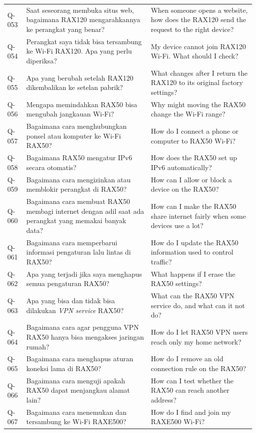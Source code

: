 \begin{longtable}{@{}>{\RaggedRight\arraybackslash}p{1.6cm}>{\RaggedRight\arraybackslash}p{5.8cm}>{\RaggedRight\arraybackslash}p{\dimexpr\textwidth-1.6cm-5.8cm-4\tabcolsep\relax}@{}}
Q-053 & Saat seseorang membuka situs web, bagaimana RAX120 mengarahkannya ke perangkat yang benar? & When someone opens a website, how does the RAX120 send the request to the right device? \\
Q-054 & Perangkat saya tidak bisa tersambung ke Wi-Fi RAX120. Apa yang perlu diperiksa? & My device cannot join RAX120 Wi-Fi. What should I check? \\
Q-055 & Apa yang berubah setelah RAX120 dikembalikan ke setelan pabrik? & What changes after I return the RAX120 to its original factory settings? \\
Q-056 & Mengapa memindahkan RAX50 bisa mengubah jangkauan Wi-Fi? & Why might moving the RAX50 change the Wi-Fi range? \\
Q-057 & Bagaimana cara menghubungkan ponsel atau komputer ke Wi-Fi RAX50? & How do I connect a phone or computer to RAX50 Wi-Fi? \\
Q-058 & Bagaimana RAX50 mengatur IPv6 secara otomatis? & How does the RAX50 set up IPv6 automatically? \\
Q-059 & Bagaimana cara mengizinkan atau memblokir perangkat di RAX50? & How can I allow or block a device on the RAX50? \\
Q-060 & Bagaimana cara membuat RAX50 membagi internet dengan adil saat ada perangkat yang memakai banyak data? & How can I make the RAX50 share internet fairly when some devices use a lot? \\
Q-061 & Bagaimana cara memperbarui informasi pengaturan lalu lintas di RAX50? & How do I update the RAX50 information used to control traffic? \\
Q-062 & Apa yang terjadi jika saya menghapus semua pengaturan RAX50? & What happens if I erase the RAX50 settings? \\
Q-063 & Apa yang bisa dan tidak bisa dilakukan \emph{VPN service} RAX50? & What can the RAX50 VPN service do, and what can it not do? \\
Q-064 & Bagaimana cara agar pengguna VPN RAX50 hanya bisa mengakses jaringan rumah? & How do I let RAX50 VPN users reach only my home network? \\
Q-065 & Bagaimana cara menghapus aturan koneksi lama di RAX50? & How do I remove an old connection rule on the RAX50? \\
Q-066 & Bagaimana cara menguji apakah RAX50 dapat menjangkau alamat lain? & How can I test whether the RAX50 can reach another address? \\
Q-067 & Bagaimana cara menemukan dan tersambung ke Wi-Fi RAXE500? & How do I find and join my RAXE500 Wi-Fi? \\

\end{longtable}
